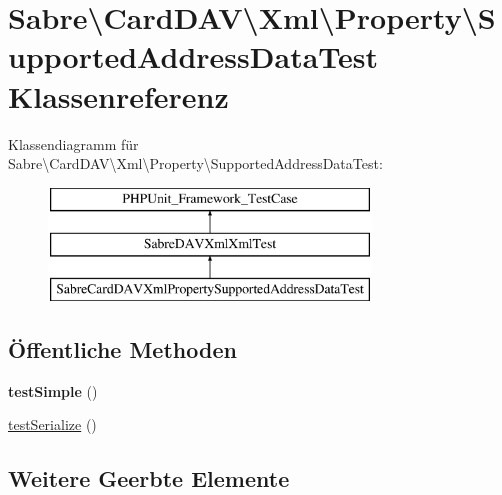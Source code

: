 \hypertarget{class_sabre_1_1_card_d_a_v_1_1_xml_1_1_property_1_1_supported_address_data_test}{}\section{Sabre\textbackslash{}Card\+D\+AV\textbackslash{}Xml\textbackslash{}Property\textbackslash{}Supported\+Address\+Data\+Test Klassenreferenz}
\label{class_sabre_1_1_card_d_a_v_1_1_xml_1_1_property_1_1_supported_address_data_test}
Klassendiagramm für Sabre\textbackslash{}Card\+D\+AV\textbackslash{}Xml\textbackslash{}Property\textbackslash{}Supported\+Address\+Data\+Test\+:\begin{figure}[H]
\begin{center}
\leavevmode
\includegraphics[height=3.000000cm]{class_sabre_1_1_card_d_a_v_1_1_xml_1_1_property_1_1_supported_address_data_test}
\end{center}
\end{figure}
\subsection*{Öffentliche Methoden}
\begin{DoxyCompactItemize}
\item 
\mbox{\label{class_sabre_1_1_card_d_a_v_1_1_xml_1_1_property_1_1_supported_address_data_test_a1b69cee8498d9275edc02beb7fc9afc2}} 
{\bfseries test\+Simple} ()
\item 
\mbox{\hyperlink{class_sabre_1_1_card_d_a_v_1_1_xml_1_1_property_1_1_supported_address_data_test_a14b985ad6ed88533b69284913dca339c}{test\+Serialize}} ()
\end{DoxyCompactItemize}
\subsection*{Weitere Geerbte Elemente}


